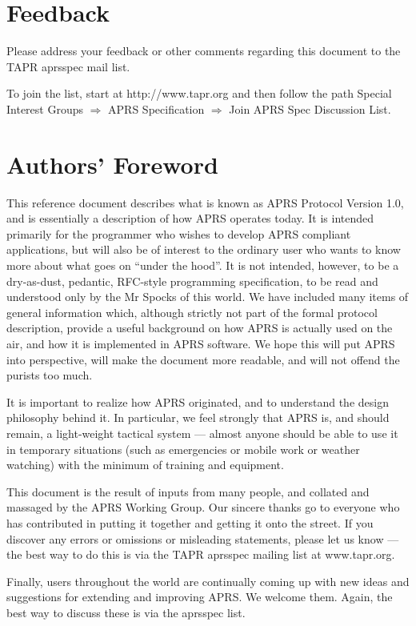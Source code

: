 \section*{Feedback}

Please address your feedback or other comments regarding this document to
the TAPR aprsspec mail list.

To join the list, start at http://www.tapr.org and then follow the path Special
Interest Groups $\Rightarrow$ APRS Specification $\Rightarrow$ Join APRS Spec Discussion List.


\section*{Authors’ Foreword}

This reference document describes what is known as APRS Protocol
Version 1.0, and is essentially a description of how APRS operates
today.  It is intended primarily for the programmer who wishes to
develop APRS compliant applications, but will also be of interest to
the ordinary user who wants to know more about what goes on “under the
hood”.  It is not intended, however, to be a dry-as-dust, pedantic,
RFC-style programming specification, to be read and understood only by
the Mr Spocks of this world. We have included many items of general
information which, although strictly not part of the formal protocol
description, provide a useful background on how APRS is actually used
on the air, and how it is implemented in APRS software. We hope this
will put APRS into perspective, will make the document more readable,
and will not offend the purists too much.

It is important to realize how APRS originated, and to understand the
design philosophy behind it. In particular, we feel strongly that APRS
is, and should remain, a light-weight tactical system — almost anyone
should be able to use it in temporary situations (such as emergencies
or mobile work or weather watching) with the minimum of training and
equipment.

This document is the result of inputs from many people, and collated
and massaged by the APRS Working Group. Our sincere thanks go to
everyone who has contributed in putting it together and getting it
onto the street. If you discover any errors or omissions or misleading
statements, please let us know — the best way to do this is via the
TAPR aprsspec mailing list at www.tapr.org.

Finally, users throughout the world are continually coming up with new
ideas and suggestions for extending and improving APRS. We welcome
them.  Again, the best way to discuss these is via the aprsspec list.

